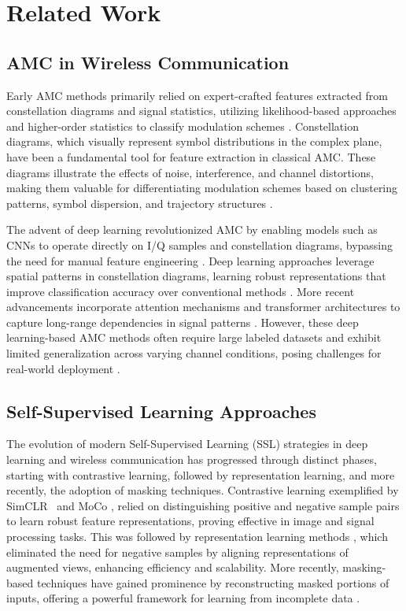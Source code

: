 \section{Related Work}

\subsection{AMC in Wireless Communication}

Early AMC methods primarily relied on expert-crafted features extracted from constellation diagrams and signal statistics, utilizing likelihood-based approaches and higher-order statistics to classify modulation schemes \cite{dobre2007survey}. Constellation diagrams, which visually represent symbol distributions in the complex plane, have been a fundamental tool for feature extraction in classical AMC. These diagrams illustrate the effects of noise, interference, and channel distortions, making them valuable for differentiating modulation schemes based on clustering patterns, symbol dispersion, and trajectory structures \cite{o2018over}. 

The advent of deep learning revolutionized AMC by enabling models such as CNNs to operate directly on I/Q samples and constellation diagrams, bypassing the need for manual feature engineering \cite{zhang2021efficient}. Deep learning approaches leverage spatial patterns in constellation diagrams, learning robust representations that improve classification accuracy over conventional methods \cite{doan2020learning}. More recent advancements incorporate attention mechanisms and transformer architectures to capture long-range dependencies in signal patterns \cite{hamidi2021mcformer}. However, these deep learning-based AMC methods often require large labeled datasets and exhibit limited generalization across varying channel conditions, posing challenges for real-world deployment \cite{ya2022large}.

\subsection{Self-Supervised Learning Approaches}

The evolution of modern Self-Supervised Learning (SSL) strategies in deep learning and wireless communication has progressed through distinct phases, starting with contrastive learning, followed by representation learning, and more recently, the adoption of masking techniques.  Contrastive learning exemplified by SimCLR~\cite{chen2020simple} and MoCo \cite{he2020momentumcontrastunsupervisedvisual}, relied on distinguishing positive and negative sample pairs to learn robust feature representations, proving effective in image and signal processing tasks. This was followed by representation learning methods \cite{grill2020bootstraplatentnewapproach, berthelot2019mixmatch}, which eliminated the need for negative samples by aligning representations of augmented views, enhancing efficiency and scalability. More recently, masking-based techniques \cite{devlin2019bert, he2022masked} have gained prominence by reconstructing masked portions of inputs, offering a powerful framework for learning from incomplete data \cite{faysal2025denomae}.

